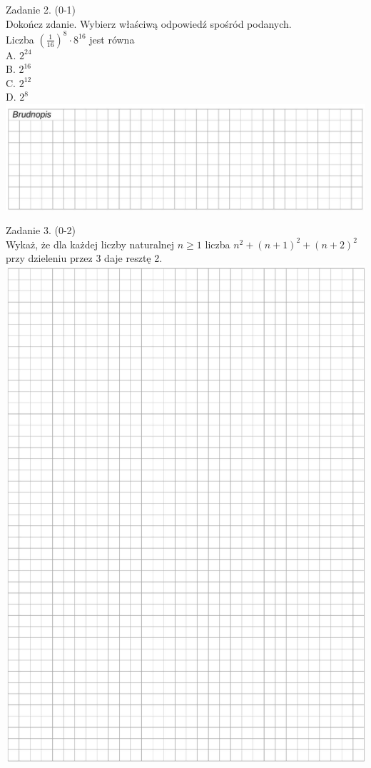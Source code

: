 \documentclass[10pt]{article}
\begin{document}
Zadanie 2. (0-1)\\
Dokończ zdanie. Wybierz właściwą odpowiedź spośród podanych.\\
Liczba \(\left(\frac{1}{16}\right)^{8} \cdot 8^{16}\) jest równa\\
A. \(2^{24}\)\\
B. \(2^{16}\)\\
C. \(2^{12}\)\\
D. \(2^{8}\)\\
\includegraphics[max width=\textwidth, center]{2024_11_21_daeb5e5efb43dd4cb535g-04(4)}

Zadanie 3. (0-2)\\
Wykaż, że dla każdej liczby naturalnej \(n \geq 1\) liczba \(n^{2}+(n+1)^{2}+(n+2)^{2}\) przy dzieleniu przez 3 daje resztę 2.\\
\includegraphics[max width=\textwidth, center]{2024_11_21_daeb5e5efb43dd4cb535g-05}
\end{document}
